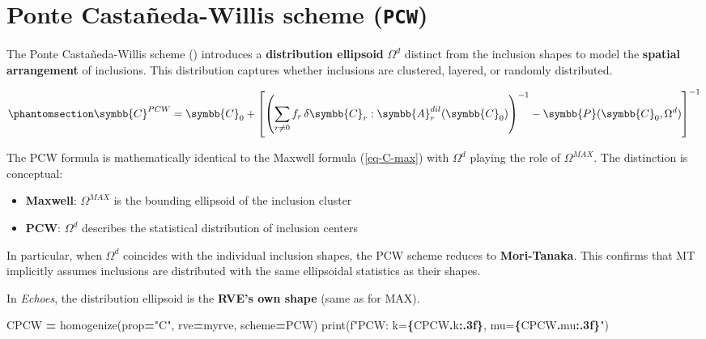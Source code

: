 \documentclass[
  a4paper,
  numbers=noendperiod,
  DIV=12]{scrreprt}
\newenvironment{Shaded}{\begin{snugshade}}{\end{snugshade}}
\newcommand{\BuiltInTok}[1]{#1}
\newcommand{\NormalTok}[1]{#1}
\newcommand{\OperatorTok}[1]{\textcolor[rgb]{0.81,0.36,0.00}{\textbf{#1}}}
\newcommand{\SpecialCharTok}[1]{\textcolor[rgb]{0.81,0.36,0.00}{\textbf{#1}}}
\newcommand{\SpecialStringTok}[1]{\textcolor[rgb]{0.31,0.60,0.02}{#1}}
\newcommand{\StringTok}[1]{\textcolor[rgb]{0.31,0.60,0.02}{#1}}
\providecommand{\tightlist}{%
  \setlength{\itemsep}{0pt}\setlength{\parskip}{0pt}}
\newcommand{\uuuu}[1]{{\symbb{{#1}}}}
\begin{document}
\section{\texorpdfstring{Ponte Castañeda-Willis scheme
(\texttt{PCW})}{Ponte Castañeda-Willis scheme (PCW)}}\label{sec-PCW}

The Ponte Castañeda-Willis scheme () introduces a \textbf{distribution ellipsoid} \(\Omega^d\)
distinct from the inclusion shapes to model the \textbf{spatial
arrangement} of inclusions. This distribution captures whether
inclusions are clustered, layered, or randomly distributed.

\begin{equation}\protect\phantomsection\label{eq-C-pcw}{
\uuuu{C}^{PCW} = \uuuu{C}_0 + \left[\left(\sum_{r \neq 0} f_r \,\delta\uuuu{C}_r : \uuuu{A}_r^{dil}(\uuuu{C}_0)\right)^{-1} - \uuuu{P}(\uuuu{C}_0, \Omega^d)\right]^{-1}
}\end{equation}

The PCW formula is mathematically identical to the Maxwell formula
(\ref{eq-C-max}) with \(\Omega^d\) playing the role of \(\Omega^{MAX}\).
The distinction is conceptual:

\begin{itemize}
\tightlist
\item
  \textbf{Maxwell}: \(\Omega^{MAX}\) is the bounding ellipsoid of the
  inclusion cluster
\item
  \textbf{PCW}: \(\Omega^d\) describes the statistical distribution of
  inclusion centers
\end{itemize}

In particular, when \(\Omega^d\) coincides with the individual inclusion
shapes, the PCW scheme reduces to \textbf{Mori-Tanaka}. This confirms
that MT implicitly assumes inclusions are distributed with the same
ellipsoidal statistics as their shapes.

In \emph{Echoes}, the distribution ellipsoid is the \textbf{RVE's own
shape} (same as for MAX).

\begin{Shaded}
\begin{Highlighting}[]
\NormalTok{CPCW }\OperatorTok{=}\NormalTok{ homogenize(prop}\OperatorTok{=}\StringTok{"C"}\NormalTok{, rve}\OperatorTok{=}\NormalTok{myrve, scheme}\OperatorTok{=}\NormalTok{PCW)}
\BuiltInTok{print}\NormalTok{(}\SpecialStringTok{f"PCW: k=}\SpecialCharTok{\{}\NormalTok{CPCW}\SpecialCharTok{.}\NormalTok{k}\SpecialCharTok{:.3f\}}\SpecialStringTok{, mu=}\SpecialCharTok{\{}\NormalTok{CPCW}\SpecialCharTok{.}\NormalTok{mu}\SpecialCharTok{:.3f\}}\SpecialStringTok{"}\NormalTok{)}
\end{Highlighting}
\end{Shaded}
\end{document}
